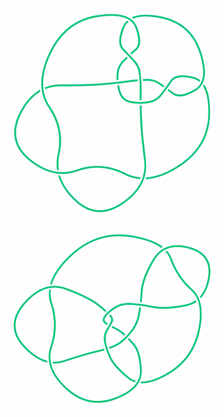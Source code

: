 \begin{figure}[H]
\begin{minipage}[b]{.14\linewidth}
    \end{minipage}
    \begin{minipage}[b]{.14\linewidth}
        \centering
        \includegraphics[width=\linewidth]{../data/perko1.png}
    \end{minipage}
    \begin{minipage}[b]{.14\linewidth}
        \centering
        \includegraphics[width=\linewidth]{../data/perko2.png}
    \end{minipage}
\end{figure}

